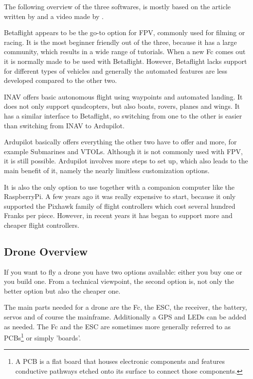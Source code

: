 \documentclass[svgnames]{article}
\begin{document}
	The following overview of the three softwares, is mostly based on the article written by \textcite{firmwarearticle} and a video made by \textcite{firmwarevideo}.
	
	Betaflight appears to be the go-to option for \gls{FPV}, commonly used for filming or racing. It is the most beginner friendly out of the three, because it has a large community, which results in a wide range of tutorials. When a new \gls{Fc} comes out it is normally made to be used with Betaflight. However, Betaflight lacks support for different types of vehicles and generally the automated features are less developed compared to the other two. 
	
	\gls{INAV} offers basic autonomous flight using waypoints and automated landing. It does not only support quadcopters, but also boats, rovers, planes and wings. It has a similar interface to Betaflight, so switching from one to the other is easier than switching from \gls{INAV} to Ardupilot.
	
	Ardupilot basically offers everything the other two have to offer and more, for example Submarines and \glspl{VTOL}. Although it is not commonly used with \gls{FPV}, it is still possible. Ardupilot involves more steps to set up, which also leads to the main benefit of it, namely the nearly limitless customization options.

	
	It is also the only option to use together with a companion computer like the RaspberryPi. A few years ago it was really expensive to start, because it only supported the Pixhawk family of flight controllers which cost several hundred Franks per piece. However, in recent years it has began to support more and cheaper flight controllers.
	


	\subsection{Drone Overview}
	If you want to fly a drone you have two options available: either you buy one or you build one. From a technical viewpoint, the second option is, not only the better option but also the cheaper one.
	
	The main parts needed for a drone are the \gls{Fc}, the \gls{ESC}, the receiver, the battery, servos and of course the mainframe. Additionally a \gls{GPS} and LEDs can be added as needed. The \gls{Fc} and the \gls{ESC} are sometimes more generally referred to as \glspl{PCB}\footnote{A \gls{PCB} is a flat board that houses electronic components and features conductive pathways etched onto its surface to connect those components.} or simply 'boards'.
\end{document}
